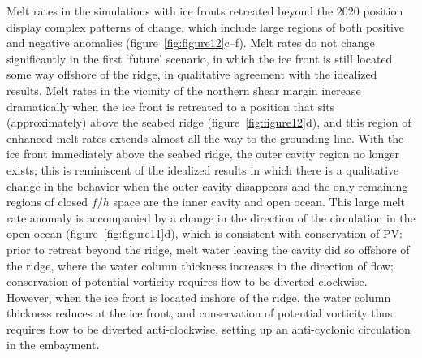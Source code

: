 \documentclass[draft]{agujournal2019}
\begin{document}
Melt rates in the simulations with ice fronts retreated beyond the 2020 position display complex patterns of change, which include large regions of both positive and negative anomalies (figure~\ref{fig:figure12}c--f). Melt rates do not change significantly in the first `future' scenario, in which the ice front is still located some way offshore of the ridge, in qualitative agreement with the idealized results. Melt rates in the vicinity of the northern shear margin increase dramatically when the ice front is retreated to a position that sits (approximately) above the seabed ridge (figure~\ref{fig:figure12}d), and this region of enhanced melt rates extends almost all the way to the grounding line. With the ice front immediately above the seabed ridge, the outer cavity region no longer exists; this is reminiscent of the idealized results in which there is a qualitative change in the behavior when the outer cavity disappears and the only remaining regions of closed $f/h$ space are the inner cavity and open ocean.  %
This large melt rate anomaly is accompanied by a change in the direction of the circulation in the open ocean (figure~\ref{fig:figure11}d), which is consistent with conservation of PV: prior to retreat beyond the ridge, melt water leaving the cavity did so offshore of the ridge, where the water column thickness increases in the direction of flow; conservation of potential vorticity requires flow to be diverted clockwise. However, when the ice front is located inshore of the ridge, the water column thickness reduces at the ice front, and conservation of potential vorticity thus requires flow to be diverted anti-clockwise, setting up an anti-cyclonic circulation in the embayment. 
\end{document}
